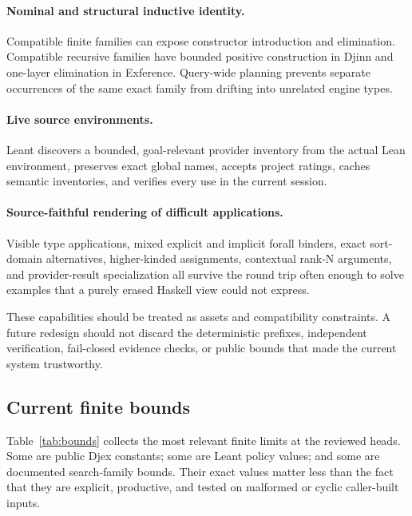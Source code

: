 \documentclass[11pt]{article}
\newcommand{\Djex}{\textsf{Djex}}
\newcommand{\Leant}{\textsf{Leant}}
\newcommand{\Djinn}{Djinn}
\newcommand{\Exference}{Exference}
\begin{document}
\paragraph{Nominal and structural inductive identity.}
Compatible finite families can expose constructor introduction and elimination.
Compatible recursive families have bounded positive construction in \Djinn{}
and one-layer elimination in \Exference{}.  Query-wide planning prevents
separate occurrences of the same exact family from drifting into unrelated
engine types.

\paragraph{Live source environments.}
\Leant{} discovers a bounded, goal-relevant provider inventory from the actual
Lean environment, preserves exact global names, accepts project ratings, caches
semantic inventories, and verifies every use in the current session.

\paragraph{Source-faithful rendering of difficult applications.}
Visible type applications, mixed explicit and implicit forall binders, exact
sort-domain alternatives, higher-kinded assignments, contextual rank-N
arguments, and provider-result specialization all survive the round trip often
enough to solve examples that a purely erased Haskell view could not express.

These capabilities should be treated as assets and compatibility constraints.
A future redesign should not discard the deterministic prefixes, independent
verification, fail-closed evidence checks, or public bounds that made the
current system trustworthy.

\subsection{Current finite bounds}

Table~\ref{tab:bounds} collects the most relevant finite limits at the reviewed
heads.  Some are public \Djex{} constants; some are \Leant{} policy values; and
some are documented search-family bounds.  Their exact values matter less than
the fact that they are explicit, productive, and tested on malformed or cyclic
caller-built inputs.
\end{document}
